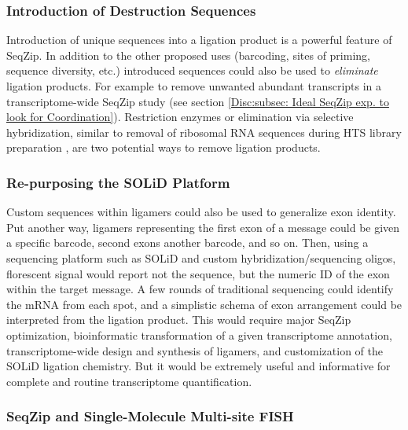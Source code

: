     \subsubsection{Introduction of Destruction Sequences}
      \label{Disc:subsubsec:Intro of Desctruction Sequences}

      Introduction of unique sequences into a ligation product is a powerful feature of SeqZip. In addition to the other proposed uses (barcoding, sites of priming, sequence diversity, etc.) introduced sequences could also be used to \textit{eliminate} ligation products. For example to remove unwanted abundant transcripts in a transcriptome-wide SeqZip study (see section \ref{Disc:subsec: Ideal SeqZip exp. to look for Coordination}). Restriction enzymes or elimination via selective hybridization, similar to removal of ribosomal RNA sequences during HTS library preparation \citep{Chen2011a}, are two potential ways to remove ligation products.

    \subsubsection{Re-purposing the SOLiD Platform}
      \label{Disc:subsubsec:SOLiD Platform for SeqZip}

      Custom sequences within ligamers could also be used to generalize exon identity. Put another way, ligamers representing the first exon of a message could be given a specific barcode, second exons another barcode, and so on. Then, using a sequencing platform such as SOLiD and custom hybridization/sequencing oligos, florescent signal would report not the sequence, but the numeric ID of the exon within the target message. A few rounds of traditional sequencing could identify the mRNA from each spot, and a simplistic schema of exon arrangement could be interpreted from the ligation product. This would require major SeqZip optimization, bioinformatic transformation of a given transcriptome annotation, transcriptome-wide design and synthesis of ligamers, and customization of the SOLiD ligation chemistry. But it would be extremely useful and informative for complete and routine transcriptome quantification.

    \subsubsection{SeqZip and Single-Molecule Multi-site FISH}
      \label{Disc:subsubsec:SeqZip and Single-Molecule FISH}

